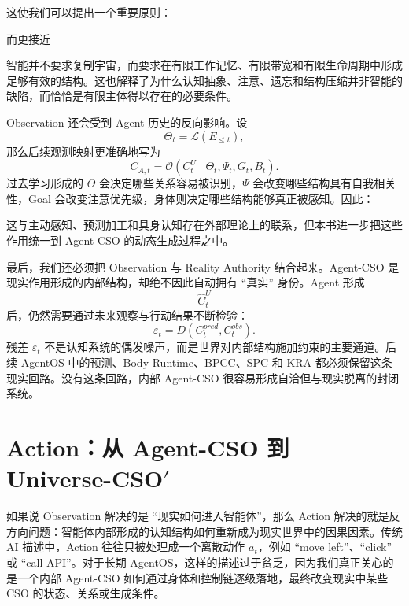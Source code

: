 这使我们可以提出一个重要原则：
\begin{statementbox}
\centering
{}
\end{statementbox}
而更接近
\begin{statementbox}
\centering
{}
\end{statementbox}
智能并不要求复制宇宙，而要求在有限工作记忆、有限带宽和有限生命周期中形成足够有效的结构。这也解释了为什么认知抽象、注意、遗忘和结构压缩并非智能的缺陷，而恰恰是有限主体得以存在的必要条件。

Observation 还会受到 Agent 历史的反向影响。设
\[
\Theta_t
=
\mathcal{L}(E_{\leq t}),
\]
那么后续观测映射更准确地写为
\[
C_{A,t}
=
\mathcal{O}
\left(
C_t^U
\mid
\Theta_t,\Psi_t,G_t,B_t
\right).
\]
过去学习形成的 $\Theta$ 会决定哪些关系容易被识别，$\Psi$ 会改变哪些结构具有自我相关性，Goal 会改变注意优先级，身体则决定哪些结构能够真正被感知。因此：
\begin{statementbox}
\centering
{}
\end{statementbox}
这与主动感知、预测加工和具身认知存在外部理论上的联系，但本书进一步把这些作用统一到 Agent-CSO 的动态生成过程之中。

最后，我们还必须把 Observation 与 Reality Authority 结合起来。Agent-CSO 是现实作用形成的内部结构，却绝不因此自动拥有 ``真实'' 身份。Agent 形成
\[
\hat C_t^U
\]
后，仍然需要通过未来观察与行动结果不断检验：
\[
\varepsilon_t
=
D
\left(
C^{pred}_{t},
C^{obs}_{t}
\right).
\]
残差 $\varepsilon_t$ 不是认知系统的偶发噪声，而是世界对内部结构施加约束的主要通道。后续 AgentOS 中的预测、Body Runtime、BPCC、SPC 和 KRA 都必须保留这条现实回路。没有这条回路，内部 Agent-CSO 很容易形成自洽但与现实脱离的封闭系统。


\section{Action：从 Agent-CSO 到 Universe-CSO$'$}

如果说 Observation 解决的是 ``现实如何进入智能体''，那么 Action 解决的就是反方向问题：智能体内部形成的认知结构如何重新成为现实世界中的因果因素。传统 AI 描述中，Action 往往只被处理成一个离散动作 $a_t$，例如 ``move left''、``click'' 或 ``call API''。对于长期 AgentOS，这样的描述过于贫乏，因为我们真正关心的是一个内部 Agent-CSO 如何通过身体和控制链逐级落地，最终改变现实中某些 CSO 的状态、关系或生成条件。

